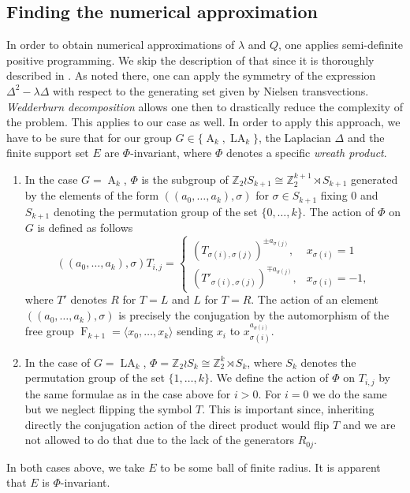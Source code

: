 \documentclass[12pt]{amsart}
\theoremstyle{definition}
\numberwithin{figure}{section}
\numberwithin{table}{section}
\numberwithin{equation}{section}
\newcommand{\OP}[1]{\operatorname{#1}}
\newcommand{\F}{\operatorname{F}}
\begin{document}
\subsection{Finding the numerical approximation}\label{ss:num-approx}
In order to obtain numerical approximations of $\lambda$ and $Q$, one applies semi-definite positive programming. We skip the description of that since it is thoroughly described in \cite{MR4023374}. As noted there, one can apply the symmetry of the expression $\Delta^2-\lambda\Delta$ with respect to the generating set given by Nielsen transvections. \emph{Wedderburn decomposition} allows one then to drastically reduce the complexity of the problem. This applies to our case as well. In order to apply this approach, we have to be sure that for our group $G\in\{\OP{A}_k,\OP{LA}_k\}$, the Laplacian $\Delta$ and the finite support set $E$ are $\Phi$-invariant, where $\Phi$ denotes a specific \emph{wreath product}. 
\begin{enumerate}  
    
\item In the case $G=\OP{A}_k$, $\Phi$ is the subgroup of $\mathbb{Z}_2\wr S_{k+1}\cong \mathbb{Z}_2^{k+1}\rtimes S_{k+1}$ generated by the elements of the form $((a_0,\ldots,a_k),\sigma)$ for $\sigma\in S_{k+1}$ fixing $0$ and $S_{k+1}$ denoting the permutation group of the set $\{0,\ldots,k\}$. The action of $\Phi$ on $G$ is defined as follows
\[
((a_0,\ldots,a_{k}),\sigma)T_{i,j}=
\begin{cases}
  (T_{\sigma(i),\sigma(j)})^{\pm a_{\sigma(j)}}, & x_{\sigma(i)}=1 \\
  (T'_{\sigma(i),\sigma(j)})^{\mp a_{\sigma(j)}}, & x_{\sigma(i)}=-1,
\end{cases}
\]
where $T'$ denotes $R$ for $T=L$ and $L$ for $T=R$. The action of an element $((a_0,\ldots,a_{k}),\sigma)$ is precisely the conjugation by the automorphism of the free group $\F_{k+1}=\langle x_0,\ldots,x_k\rangle$ sending $x_i$ to $x_{\sigma(i)}^{a_{\sigma(i)}}$.

 \item In the case of $G=\OP{LA}_k$, $\Phi=\mathbb{Z}_2\wr S_k\cong \mathbb{Z}_2^k\rtimes S_k$, where $S_k$ denotes the permutation group of the set $\{1,\ldots,k\}$. We define the action of $\Phi$ on $T_{i,j}$ by the same formulae as in the case above for $i>0$. For $i=0$ we do the same but we neglect flipping the symbol $T$. This is important since, inheriting directly the conjugation action of the direct product would flip $T$ and we are not allowed to do that due to the lack of the generators $R_{0j}$.
\end{enumerate}
In both cases above, we take $E$ to be some ball of finite radius. It is apparent that $E$ is $\Phi$-invariant.
\end{document}
